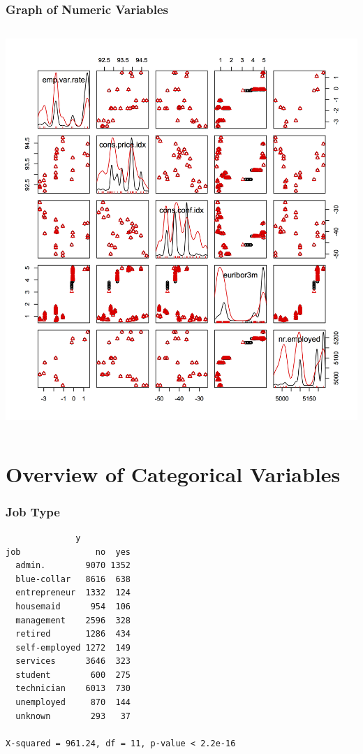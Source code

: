 \documentclass{beamer}
\begin{document}
\begin{frame}
  \frametitle{Graph of Numeric Variables}
	\begin{columns}[c] %
    \includegraphics[height=\textheight]{matrix2}
  \end{columns}
\end{frame}

\section{Overview of Categorical Variables}

\begingroup
\small
\begin{frame}[fragile]
  \frametitle{Job Type}
  \begin{verbatim}
              y
job               no  yes
  admin.        9070 1352
  blue-collar   8616  638
  entrepreneur  1332  124
  housemaid      954  106
  management    2596  328
  retired       1286  434
  self-employed 1272  149
  services      3646  323
  student        600  275
  technician    6013  730
  unemployed     870  144
  unknown        293   37

X-squared = 961.24, df = 11, p-value < 2.2e-16
  \end{verbatim}
\end{frame}
\endgroup
\end{document}

